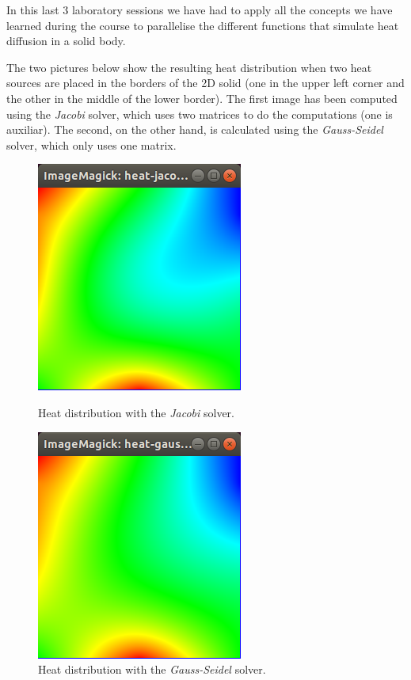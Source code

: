 \documentclass[12pt, a4paper]{article}
\begin{document}
In this last 3 laboratory sessions we have had to apply all the concepts we have learned during the course to parallelise the different functions that simulate heat diffusion in a solid body.

The two pictures below show the resulting heat distribution when two heat sources are placed in the borders of the 2D solid (one in the upper left corner and the other in the middle of the lower border). The first image has been computed using the \textit{Jacobi} solver, which uses two matrices to do the computations (one is auxiliar). The second, on the other hand, is calculated using the \textit{Gauss-Seidel} solver, which only uses one matrix.

\begin{figure}[H]
\centering
\hspace{-0.5cm}
\begin{minipage}{0.4\linewidth}
  \centering
  \includegraphics[scale=0.5]{./images/heat-jacobi}
  \caption{Heat distribution with the \textit{Jacobi} solver.}
\end{minipage}
\hspace{0.5cm}
\begin{minipage}{0.4\linewidth}
  \centering
  \includegraphics[scale=0.5]{./images/heat-gauss-seidel}
  \caption{Heat distribution with the \textit{Gauss-Seidel} solver.}
\end{minipage}
\end{figure}
\end{document}
